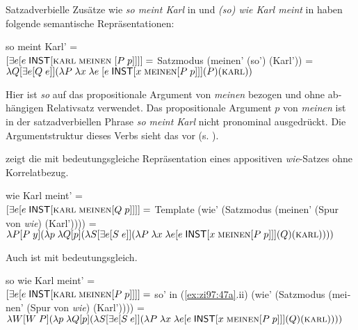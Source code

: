 \documentclass[output=paper, colorlinks, citecolor=brown, booklanguage=german]{langscibook}
\begin{document}
\begin{otherlanguage}{german}
Satzadverbielle Zusätze wie \textit{so meint Karl} in  und \textit{(so) wie Karl meint} in  haben folgende semantische Repräsentationen:

\ea \label{ex:zi97:51} so meint Karl' = \\
$[\exists e [e \; \cnst{inst} [\textsc{karl} \; \textsc{meinen} \; [P \; p]]]] =$ \newline 
Satzmodus (meinen' (so') (Karl')) = \newline
$\lambda Q [\exists e [Q\; e]] (\lambda P \; \lambda x \; \lambda e \; [e \; \cnst{inst} [x \; \textsc{meinen} [P \; p]]] (P) (\textsc{karl}))$
\z

\noindent Hier ist \textit{so} auf das propositionale Argument von \textit{meinen} bezogen und ohne abhängigen Relativsatz verwendet. Das propositionale Argument $p$ von \textit{meinen} ist in der satzadverbiellen Phrase \textit{so meint Karl} nicht pronominal ausgedrückt. Die Argumentstruktur dieses Verbs sieht das vor (s. ).

 zeigt die mit  bedeutungsgleiche Repräsentation eines appositiven \textit{wie}-Satzes ohne Korrelatbezug.

\ea \label{ex:zi97:52} wie Karl meint' = \\
$[\exists e [e \; \cnst{inst} [\textsc{karl} \; \textsc{meinen} [Q \; p]]]] =$ \newline
Template  (wie' (Satzmodus (meinen' (Spur von \textit{wie}) (Karl')))) = \newline
$\lambda P [P \; y] (\lambda p \; \lambda Q [p] (\lambda S [\exists e [S \; e]] (\lambda P \; \lambda x \; \lambda e %
[e \; \cnst{inst} [x \; \textsc{meinen} [P \; p]]] (Q) (\textsc{karl}))))$
\z

\noindent Auch  ist mit  bedeutungsgleich.

\ea \label{ex:zi97:53} so wie Karl meint' = \\
$[\exists e [e \; \cnst{inst} [\textsc{karl} \; \textsc{meinen} [P \; p]]]] =$ \newline
so' in (\ref{ex:zi97:47a}.ii) (wie' (Satzmodus (meinen' (Spur von \textit{wie}) (Karl')))) = \newline
$\lambda W [W \; P] (\lambda p \; \lambda Q [p] (\lambda S [\exists e [S \; e]] (\lambda P \; \lambda x \; \lambda e %
[e \; \cnst{inst} [x \; \textsc{meinen} [P \; p]]] \newline (Q) (\textsc{karl}))))$
\z


\end{otherlanguage}
\end{document}
